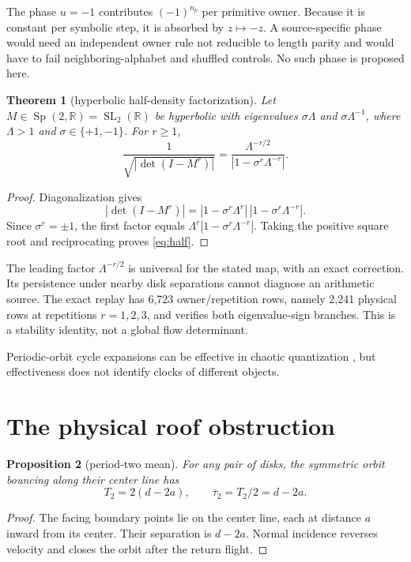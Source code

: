 \documentclass[11pt,a4paper]{article}
\newtheorem{theorem}{Theorem}[section]
\newtheorem{proposition}[theorem]{Proposition}
\theoremstyle{definition}
\theoremstyle{remark}
\newcommand{\SL}{\operatorname{SL}}
\begin{document}
The phase \(u=-1\) contributes \((-1)^{n_p}\) per primitive owner. Because it is constant per symbolic step, it is absorbed by \(z\mapsto-z\). A source-specific phase would need an independent owner rule not reducible to length parity and would have to fail neighboring-alphabet and shuffled controls. No such phase is proposed here.

\begin{theorem}[hyperbolic half-density factorization]\label{thm:half}
Let \(M\in\operatorname{Sp}(2,\mathbb R)=\SL_2(\mathbb R)\) be hyperbolic with eigenvalues \(\sigma\Lambda\) and \(\sigma\Lambda^{-1}\), where \(\Lambda>1\) and \(\sigma\in\{+1,-1\}\). For \(r\ge1\),
\begin{equation}\label{eq:half}
 \frac{1}{\sqrt{|\det(I-M^r)|}}
 =\frac{\Lambda^{-r/2}}{|1-\sigma^r\Lambda^{-r}|}.
\end{equation}
\end{theorem}

\begin{proof}
Diagonalization gives
\[
 |\det(I-M^r)|
 =|1-\sigma^r\Lambda^r|\,|1-\sigma^r\Lambda^{-r}|.
\]
Since \(\sigma^r=\pm1\), the first factor equals
\(\Lambda^r|1-\sigma^r\Lambda^{-r}|\). Taking the positive square root and reciprocating proves \cref{eq:half}.
\end{proof}

The leading factor \(\Lambda^{-r/2}\) is universal for the stated map, with an exact correction. Its persistence under nearby disk separations cannot diagnose an arithmetic source. The exact replay has 6,723 owner/repetition rows, namely 2,241 physical rows at repetitions \(r=1,2,3\), and verifies both eigenvalue-sign branches. This is a stability identity, not a global flow determinant.

Periodic-orbit cycle expansions can be effective in chaotic quantization \citep[pp.~823--826]{CvitanovicEckhardt1989}, but effectiveness does not identify clocks of different objects.

\section{The physical roof obstruction}

\begin{proposition}[period-two mean]\label{prop:t2}
For any pair of disks, the symmetric orbit bouncing along their center line has
\[
 T_2=2(d-2a),\qquad \overline{\tau}_2=T_2/2=d-2a.
\]
\end{proposition}
\begin{proof}
The facing boundary points lie on the center line, each at distance \(a\) inward from its center. Their separation is \(d-2a\). Normal incidence reverses velocity and closes the orbit after the return flight.
\end{proof}
\end{document}
